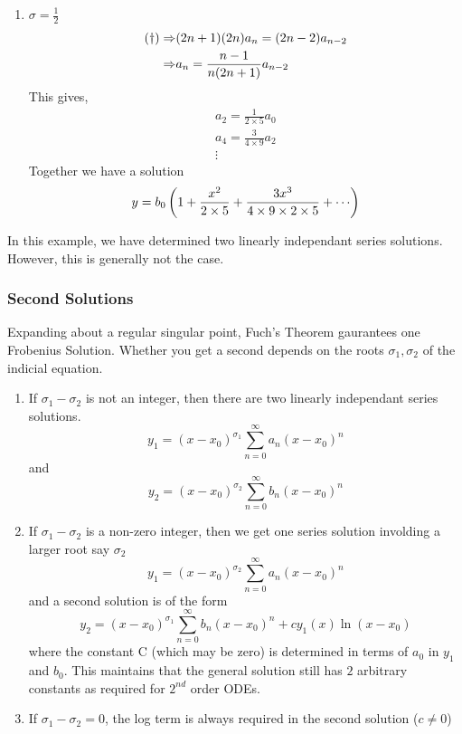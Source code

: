 \documentclass{article}
\begin{document}
\begin{eg}
\begin{enumerate}[cases]
        \item $\sigma = \frac{1}{2}$
        \begin{align*}
            \text{($\dagger$)} \Rightarrow& (2n + 1)(2n)a_n = (2n -2)a_{n-2} \\
            \Rightarrow& a_n = \frac{n-1}{n (2n + 1)} a_{n-2}
        \end{align*}
        This gives,
        \begin{align*}
            a_2 = \frac{1}{2 \times 5} a_0 \\
            a_4 = \frac{3}{4 \times 9} a_2 \\
            \vdots
        \end{align*}
        Together we have a solution
        \[
            y = b_0 \bkt{1 + \frac{x^2}{2 \times 5} + \frac{3x^3}{4 \times 9 \times 2 \times 5} + \cdots}  
        \]
    \end{enumerate}
    In this example, we have determined two linearly independant series solutions. However, this is generally not the case.
\end{eg}

\subsubsection{Second Solutions}
Expanding about a regular singular point, Fuch's Theorem gaurantees one Frobenius Solution. 
Whether you get a second depends on the roots $\sigma_1, \sigma_2$ of the indicial equation.
\begin{enumerate}
    \item If $\sigma_1 - \sigma_2$ is not an integer, then there are two linearly independant series solutions. 
    \[
        y_1 = (x - x_0)^{\sigma_1} \sum_{n=0}^{\infty}{a_n (x - x_0)^n}
    \] 
    and
    \[
        y_2 = (x - x_0)^{\sigma_2} \sum_{n=0}^{\infty}{b_n (x - x_0)^n}
    \] 

    \item If $\sigma_1 - \sigma_2$ is a non-zero integer, then we get one series solution involding a larger root say $\sigma_2$
    \[
        y_1 = (x - x_0)^{\sigma_2} \sum_{n=0}^{\infty}{a_n (x - x_0)^n}
    \]
    and a second solution is of the form
    \[
        y_2 = (x - x_0)^{\sigma_1} \sum_{n=0}^{\infty}{b_n (x - x_0)^n} + cy_1(x) \ln(x - x_0)
    \]
    where the constant C (which may be zero) is determined in terms of $a_0$ in $y_1$ and $b_0$.
    This maintains that the general solution still has $2$ arbitrary constants as required for $2^{nd}$ order ODEs.

    \item If $\sigma_1 - \sigma_2 = 0$, the log term is always required in the second solution ($c \neq 0$)
\end{enumerate}
\end{document}
